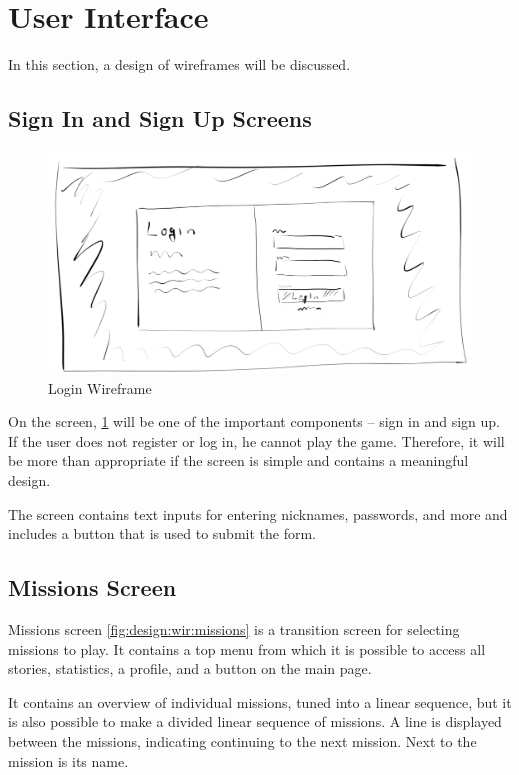 \section{User Interface}
\label{design:ui}

In this section, a design of wireframes will be discussed.

\subsection{Sign In and Sign Up Screens}

\begin{figure}
    \centering
    \includegraphics[width=1\linewidth]{assets/design/ui/wir_login.png}
    \caption{Login Wireframe}
    \label{fig:design:wir:login}
\end{figure}

On the screen, \ref{fig:design:wir:login} will be one of the important components -- sign in and sign up.
If the user does not register or log in, he cannot play the game.
Therefore, it will be more than appropriate if the screen is simple and contains a meaningful design.

The screen contains text inputs for entering nicknames, passwords, and more and includes a button that is used to submit the form.

\subsection{Missions Screen}

Missions screen \ref{fig:design:wir:missions} is a transition screen for selecting missions to play.
It contains a top menu from which it is possible to access all stories, statistics, a profile, and a button on the main page.

It contains an overview of individual missions, tuned into a linear sequence, but it is also possible to make a divided linear sequence of missions.
A line is displayed between the missions, indicating continuing to the next mission.
Next to the mission is its name.

